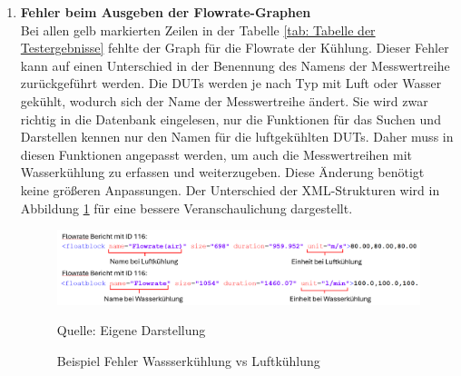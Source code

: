 \begin{enumerate}
\item \textbf{Fehler beim Ausgeben der Flowrate-Graphen} \\
Bei allen gelb markierten Zeilen in der Tabelle \ref{tab: Tabelle der Testergebnisse} fehlte der Graph für die Flowrate der Kühlung.
Dieser Fehler kann auf einen Unterschied in der Benennung des Namens der Messwertreihe zurückgeführt werden.
Die DUTs werden je nach Typ mit Luft oder Wasser gekühlt, wodurch sich der Name der Messwertreihe ändert.
Sie wird zwar richtig in die Datenbank eingelesen, nur die Funktionen für das Suchen und Darstellen kennen nur den Namen für die luftgekühlten DUTs.
Daher muss in diesen Funktionen angepasst werden, um auch die Messwertreihen mit Wasserkühlung zu erfassen und weiterzugeben.
Diese Änderung benötigt keine größeren Anpassungen.
Der Unterschied der XML-Strukturen wird in Abbildung \ref{fig:Beispiel Fehler Wassserkühlung vs Luftkühlung} für eine bessere Veranschaulichung dargestellt.

    \begin{figure}[H]
    \centering
    \includegraphics[width=1\textwidth]{Grafiken/Beispiel Fehler Wasserkuehlung vs Luftkuehlung.png}
    \caption{Beispiel Fehler Wassserkühlung vs Luftkühlung}
    \label{fig:Beispiel Fehler Wassserkühlung vs Luftkühlung}
    {Quelle: Eigene Darstellung}

\end{figure}

\end{enumerate}

